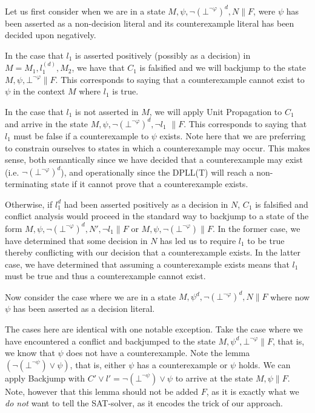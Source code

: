 \documentclass{llncs}
\begin{document}
Let us first consider when we are in a state $M, \psi, \neg( \bot^{\neg \varphi} )^d, N \parallel F$, were $\psi$ has been asserted as a non-decision literal and its counterexample literal has been decided upon negatively.

In the case that $l_1$ is asserted positively (possibly as a decision) in $M = M_1, l^{(d)}_1, M_2$, we have that $C_1$ is falsified and we will backjump to the state $M, \psi, \bot^{\neg \varphi} \parallel F$.
This corresponds to saying that a counterexample cannot exist to $\psi$ in the context $M$ where $l_1$ is true.

In the case that $l_1$ is not asserted in $M$, we will apply Unit Propagation to $C_1$ and arrive in the state $M, \psi, \neg( \bot^{\neg \varphi} )^d, \neg l_1$ $\parallel F$.
This corresponds to saying that $l_1$ must be false if a counterexample to $\psi$ exists.
Note here that we are preferring to constrain ourselves to states in which a counterexample may occur.
This makes sense, both semantically since we have decided that a counterexample may exist (i.e. $\neg( \bot^{\neg \varphi} )^d$), and operationally since the DPLL(T) will reach a non-terminating state if it cannot prove that a counterexample exists.

Otherwise, if $l_1^d$ had been asserted positively as a decision in $N$, $C_1$ is falsified and conflict analysis would proceed in the standard way to backjump to a state of the form $M, \psi, \neg( \bot^{\neg \varphi} )^d, N', \neg l_1 \parallel F$ or $M, \psi, \neg( \bot^{\neg \varphi} )  \parallel F$.
In the former case, we have determined that some decision in $N$ has led us to require $l_1$ to be true thereby conflicting with our decision that a counterexample exists.
In the latter case, we have determined that assuming a counterexample exists means that $l_1$ must be true and thus a counterexample cannot exist.

Now consider the case where we are in a state $M, \psi^d, \neg( \bot^{\neg \varphi} )^d, N  \parallel F$ where now $\psi$ has been asserted as a decision literal.

The cases here are identical with one notable exception.
Take the case where we have encountered a conflict and backjumped to the state $M, \psi^d, \bot^{\neg \varphi} \parallel F$, that is, we know that $\psi$ does not have a counterexample.
Note the lemma $(\neg (\bot^{\neg \psi}) \vee \psi)$, that is, either $\psi$ has a counterexample or $\psi$ holds.
We can apply Backjump with $C' \vee l' = \neg (\bot^{\neg \psi}) \vee \psi$ to arrive at the state $M, \psi \parallel F$.
Note, however that this lemma should not be added $F$, as it is exactly what we \emph{do not} want to tell the SAT-solver, as it encodes the trick of our approach.
\end{document}
